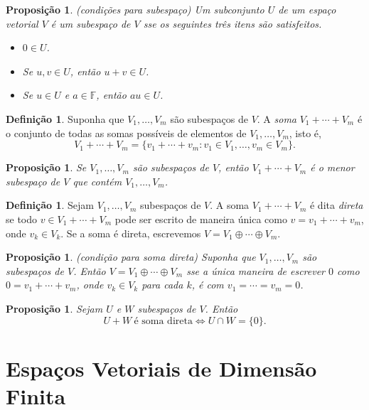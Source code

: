 \documentclass[12pt]{article}
\theoremstyle{plain}
\newtheorem{prop}[thm]{Proposição}
\theoremstyle{definition}
\newtheorem{defn}[thm]{Definição}
\theoremstyle{remark}
\begin{document}
\begin{prop} (condições para subespaço)
    Um subconjunto \(U\) de um espaço vetorial \(V\) é um subespaço de \(V\) sse os seguintes três itens são satisfeitos.
    \begin{itemize}
        \item \(0 \in U\).
        \item Se \(u, v \in U\), então \(u + v \in U\).
        \item Se \(u \in U\) e \(a \in \mathbb{F}\), então \(au \in U\).
    \end{itemize}
\end{prop}

\begin{defn}
    Suponha que \(V_1,\ldots,V_m\) são subespaços de \(V\). A \emph{soma} \(V_1 + \cdots + V_m\) é o conjunto de todas as somas possíveis de elementos de \(V_1, \ldots, V_m\), isto é,
    \[
        V_1 + \cdots + V_m = \{v_1 + \cdots + v_m : v_1 \in V_1, \ldots, v_m \in V_m\}.
    \]
\end{defn}

\begin{prop}
    Se \(V_1, \ldots, V_m\) são subespaços de \(V\), então \(V_1 + \cdots + V_m\) é o menor subespaço de \(V\) que contém \(V_1, \ldots, V_m\).
\end{prop}

\begin{defn}
    Sejam \(V_1, \ldots, V_m\) subespaços de \(V\). A soma \(V_1 + \cdots + V_m\) é dita \emph{direta} se todo \(v \in V_1 + \cdots + V_m\) pode ser escrito de maneira única como \(v = v_1 + \cdots + v_m\), onde \(v_k \in V_k\). Se a soma é direta, escrevemos \(V = V_1 \oplus \cdots \oplus V_m\).
\end{defn}

\begin{prop} (condição para soma direta)
    Suponha que \(V_1, \ldots, V_m\) são subespaços de \(V\). Então \(V = V_1 \oplus \cdots \oplus V_m\) sse a única maneira de escrever \(0\) como \(0 = v_1 + \cdots + v_m\), onde \(v_k \in V_k\) para cada \(k\), é com \(v_1 = \cdots = v_m = 0\).
\end{prop}

\begin{prop}
    Sejam \(U\) e \(W\) subespaços de \(V\). Então \[U + W \ \text{é soma direta} \iff U \cap W = \{0\}.\]
\end{prop}

\section{Espaços Vetoriais de Dimensão Finita}
\end{document}
